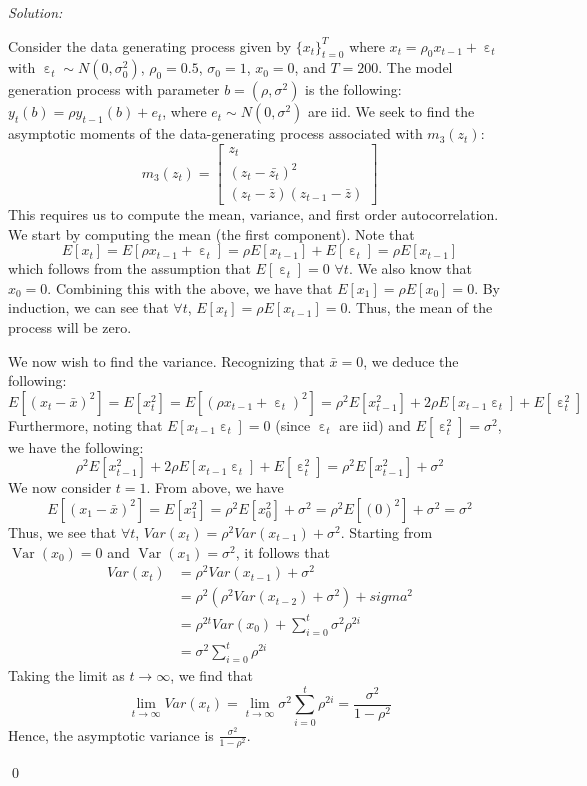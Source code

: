 \documentclass[12pt]{article}
\DeclareMathOperator*{\Var}{\text{Var}}
\DeclareMathOperator{\eps}{\varepsilon}
\newenvironment{problem}[2][Problem]{\begin{trivlist}
\item[\hskip \labelsep {\bfseries #1}\hskip \labelsep {\bfseries #2.}]}{\end{trivlist}}
\newenvironment{sol}
    {\emph{Solution:}
    }
    {
    \qed
    }
\begin{document}
\begin{problem}{1}
\end{problem}
\begin{sol}
    Consider the data generating process given by  $\{x_t\}_{t=0}^T$ where $x_t = \rho_0 x_{t-1} + \eps_t$ with $\eps_t \sim N(0, \sigma^2_0)$, $\rho_0 = 0.5$, $\sigma_0 = 1$, $x_0 = 0$, and $T = 200$. The model generation process with parameter $b = (\rho, \sigma^2)$ is the following: $y_t(b) = \rho y_{t-1}(b) + e_t$, where $e_t \sim N(0,\sigma^2)$ are iid. We seek to find the asymptotic moments of the data-generating process associated with $m_3(z_t)$:
    \[m_3(z_t) = \begin{bmatrix} z_t\\(z_t - \bar{z_t})^2\\ (z_t - \bar{z})(z_{t-1} - \bar{z})\end{bmatrix}\]
    This requires us to compute the mean, variance, and first order autocorrelation. We start by computing the mean (the first component). Note that
    \[E[x_t] = E[\rho x_{t-1} +  \eps_t] = \rho E[x_{t-1}] + E[\eps_t] = \rho E[x_{t-1}]\]
    which follows from the assumption that $E[\eps_t] = 0$ $\forall t$. We also know that $x_0 = 0$. Combining this with the above, we have that $E[x_1] = \rho E[x_0] = 0$. By induction, we can see that $\forall t$, $E[x_t] = \rho E[x_{t-1}] = 0$. Thus, the mean of the process will be zero.

    We now wish to find the variance. Recognizing that $\bar{x} = 0$, we deduce the following:
    \[E[(x_t - \bar{x})^2] = E[x_t^2] = E[(\rho x_{t-1} + \eps_t)^2] = \rho^2 E[x_{t-1}^2] + 2\rho E[x_{t-1} \eps_t] + E[\eps_t^2]\]
    Furthermore, noting that $E[x_{t-1} \eps_t] = 0$ (since $\eps_t$ are iid) and $E[\eps_t^2] = \sigma^2$, we have the following:
    \[\rho^2 E[x_{t-1}^2] + 2\rho E[x_{t-1} \eps_t] + E[\eps_t^2] = \rho^2 E[x_{t-1}^2] + \sigma^2\]
    We now consider $t = 1$. From above, we have
    \[E[(x_1 - \bar{x})^2] = E[x_1^2] = \rho^2 E[x_{0}^2] + \sigma^2 = \rho^2 E[(0)^2] + \sigma^2 = \sigma^2\]
    Thus, we see that $\forall t$, $Var(x_t) = \rho^2 Var(x_{t-1}) + \sigma^2$. Starting from $\Var(x_0) = 0$ and $\Var(x_1) = \sigma^2$, it follows that 
    \begin{align*}Var(x_t) &= \rho^2 Var(x_{t-1}) + \sigma^2 \\
        &= \rho^2 (\rho^2 Var(x_{t-2}) + \sigma^2) + sigma^2\\
        &= \rho^{2t} Var(x_{0}) + \sum_{i=0}^t \sigma^2 \rho^{2i}\\
        &= \sigma^2 \sum_{i=0}^t \rho^{2i}
    \end{align*}
    Taking the limit as $t \rightarrow \infty$, we find that 
    \[\lim_{t \rightarrow \infty} Var(x_t) = \lim_{t \rightarrow \infty} \sigma^2 \sum_{i=0}^t \rho^{2i} = \frac{\sigma^2}{1 - \rho^2} \]
    Hence, the asymptotic variance is $\frac{\sigma^2}{1-\rho^2}$.


\end{sol}
\end{document}
